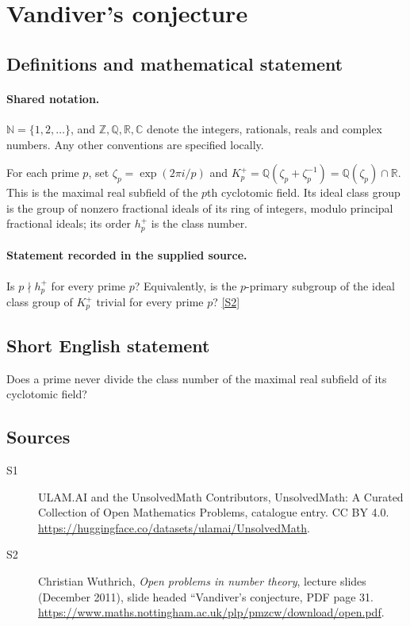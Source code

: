 \documentclass[11pt]{article}
\newcommand{\sref}[2]{\hyperlink{source:#1:#2}{[S#2]}}
\begin{document}
\section{Vandiver's conjecture}\label{statement}

\subsection{Definitions and mathematical statement}

\paragraph{Shared notation.}$\mathbb N=\{1,2,\ldots\}$, and $\mathbb Z,\mathbb Q,\mathbb R,\mathbb C$ denote the integers, rationals, reals and complex numbers. Any other conventions are specified locally.


For each prime $p$, set $\zeta_p=\exp(2\pi i/p)$ and $K_p^+=\mathbb Q(\zeta_p+\zeta_p^{-1})=\mathbb Q(\zeta_p)\cap\mathbb R$. This is the maximal real subfield of the $p$th cyclotomic field. Its ideal class group is the group of nonzero fractional ideals of its ring of integers, modulo principal fractional ideals; its order $h_p^+$ is the class number.
\paragraph{Statement recorded in the supplied source.}
Is $p\nmid h_p^+$ for every prime $p$? Equivalently, is the $p$-primary subgroup of the ideal class group of $K_p^+$ trivial for every prime $p$? \sref{statement}{2}

\subsection{Short English statement}
Does a prime never divide the class number of the maximal real subfield of its cyclotomic field?
\subsection{Sources}
\begin{description}
\item[\hypertarget{source:statement:1}{S1}] ULAM.AI and the UnsolvedMath Contributors, UnsolvedMath: A Curated Collection of Open Mathematics Problems, catalogue entry. CC BY 4.0. \url{https://huggingface.co/datasets/ulamai/UnsolvedMath}.
\item[\hypertarget{source:statement:2}{S2}] Christian Wuthrich, \emph{Open problems in number theory}, lecture slides (December 2011), slide headed ``Vandiver's conjecture, PDF page 31. \url{https://www.maths.nottingham.ac.uk/plp/pmzcw/download/open.pdf}.
\end{description}
\label{end:statement}
\end{document}
